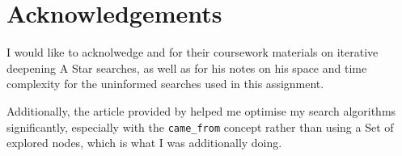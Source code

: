 \section{Acknowledgements}
\label{sec:Acknowledgements}

I would like to acknolwedge \citet{rbruce1998} and \citet{amackworth1998} for
their coursework materials on iterative deepening A Star searches, as well as
\citet{canderson2012} for his notes on his space and time complexity for
the uninformed searches used in this assignment.

Additionally, the article provided by \citet{redblob2014} helped me optimise
my search algorithms significantly, especially with the \texttt{came\_from}
concept rather than using a Set of explored nodes, which is what I was
additionally doing.
